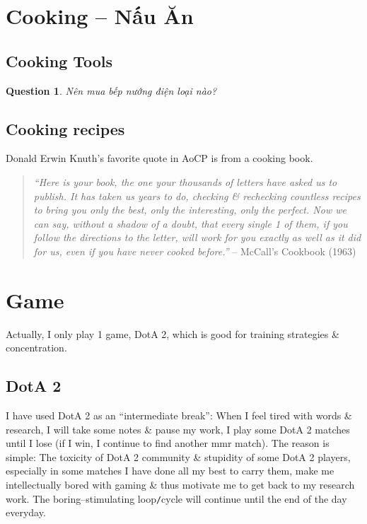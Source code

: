 \documentclass{article}
\newtheorem{question}{Question}
\begin{document}

\section{Cooking -- Nấu Ăn}

\subsection{Cooking Tools}

\begin{question}
	Nên mua bếp nướng điện loại nào?
\end{question}

\subsection{Cooking recipes}
{\sc Donald Erwin Knuth}'s favorite quote in AoCP is from a cooking book.
\begin{quote}
	{\it``Here is your book, the one your thousands of letters have asked us to publish. It has taken us years to do, checking \& rechecking countless recipes to bring you only the best, only the interesting, only the perfect. Now we can say, without a shadow of a doubt, that every single 1 of them, if you follow the directions to the letter, will work for you exactly as well as it did for us, even if you have never cooked before.''} -- {\sc McCall}'s Cookbook (1963)
\end{quote}


\section{Game}
Actually, I only play 1 game, DotA 2, which is good for training strategies \& concentration.

\subsection{DotA 2}
I have used DotA 2 as an ``intermediate break'': When I feel tired with words \& research, I will take some notes \& pause my work, I play some DotA 2 matches until I lose (if I win, I continue to find another {\sc mmr} match). The reason is simple: The toxicity of DotA 2 community \& stupidity of some DotA 2 players, especially in some matches I have done all my best to carry them, make me intellectually bored with gaming \& thus motivate me to get back to my research work. The boring--stimulating loop{\tt/}cycle will continue until the end of the day everyday.
\end{document}
